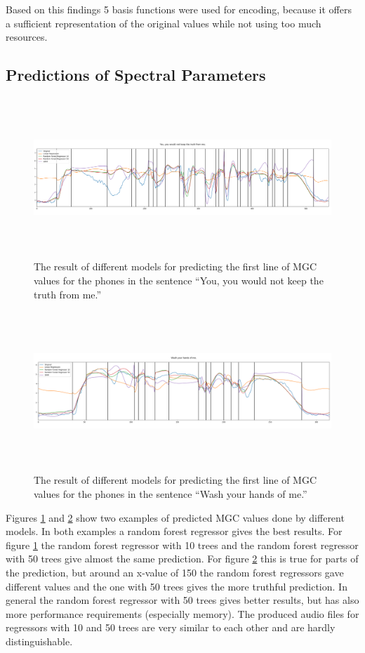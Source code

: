 \documentclass{article}
\begin{document}
Based on this findings 5 basis functions were used for encoding, because it 
offers a sufficient representation of the original values while not using too 
much resources.

\subsection{Predictions of Spectral Parameters}
\begin{figure}
	\centering
	\includegraphics[height=6cm,keepaspectratio]{cmu_us_arctic_slt_a0101}
	\caption{The result of different models for predicting the first line of MGC 
	values for the phones in the sentence ``You, you would not keep the truth 
	from me.''}
	\label{prediction1}
\end{figure}

\begin{figure}
	\centering
	\includegraphics[height=6cm,keepaspectratio]{cmu_us_arctic_slt_a0240}
	\caption{The result of different models for predicting the first line of MGC 
	values for the phones in the sentence ``Wash your hands of me.''}
	\label{prediction2}
\end{figure}

Figures \ref{prediction1} and \ref{prediction2} show two examples of predicted 
MGC values done by different models. In both examples a random forest regressor 
gives the best results. For figure \ref{prediction1} the random forest 
regressor with 10 trees and the random forest regressor with 50 trees give 
almost the same prediction. For figure \ref{prediction2} this is true for parts 
of the prediction, but around an x-value of 150 the random forest regressors 
gave different values and the one with 50 trees gives the more truthful 
prediction. In general the random forest regressor with 50 trees gives better 
results, but has also more performance requirements (especially memory). The 
produced audio files for regressors with 10 and 50 trees are very similar to 
each other and are hardly distinguishable.
\end{document}
